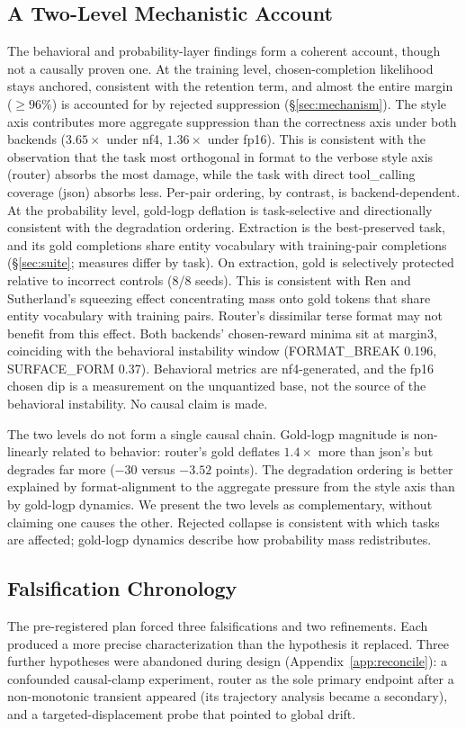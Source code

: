 \documentclass{article}
\begin{document}
\subsection{A Two-Level Mechanistic Account}
The behavioral and probability-layer findings form a coherent account, though not a causally proven one. At the training level, chosen-completion likelihood stays anchored, consistent with the retention term, and almost the entire margin (${\geq}96\%$) is accounted for by rejected suppression (\S\ref{sec:mechanism}). The style axis contributes more aggregate suppression than the correctness axis under both backends ($3.65\times$ under nf4, $1.36\times$ under fp16). This is consistent with the observation that the task most orthogonal in format to the verbose style axis (router) absorbs the most damage, while the task with direct tool\_calling coverage (json) absorbs less. Per-pair ordering, by contrast, is backend-dependent. At the probability level, gold-logp deflation is task-selective and directionally consistent with the degradation ordering. Extraction is the best-preserved task, and its gold completions share entity vocabulary with training-pair completions (\S\ref{sec:suite}; measures differ by task). On extraction, gold is selectively protected relative to incorrect controls (8/8 seeds). This is consistent with Ren and Sutherland's squeezing effect concentrating mass onto gold tokens that share entity vocabulary with training pairs. Router's dissimilar terse format may not benefit from this effect. Both backends' chosen-reward minima sit at margin3, coinciding with the behavioral instability window (FORMAT\_BREAK 0.196, SURFACE\_FORM 0.37). Behavioral metrics are nf4-generated, and the fp16 chosen dip is a measurement on the unquantized base, not the source of the behavioral instability. No causal claim is made.

The two levels do not form a single causal chain. Gold-logp magnitude is non-linearly related to behavior: router's gold deflates $1.4\times$ more than json's but degrades far more ($-30$ versus $-3.52$ points). The degradation ordering is better explained by format-alignment to the aggregate pressure from the style axis than by gold-logp dynamics. We present the two levels as complementary, without claiming one causes the other. Rejected collapse is consistent with which tasks are affected; gold-logp dynamics describe how probability mass redistributes.

\subsection{Falsification Chronology}
\label{sec:chronology}
The pre-registered plan forced three falsifications and two refinements. Each produced a more precise characterization than the hypothesis it replaced. Three further hypotheses were abandoned during design (Appendix~\ref{app:reconcile}): a confounded causal-clamp experiment, router as the sole primary endpoint after a non-monotonic transient appeared (its trajectory analysis became a secondary), and a targeted-displacement probe that pointed to global drift.
\end{document}
